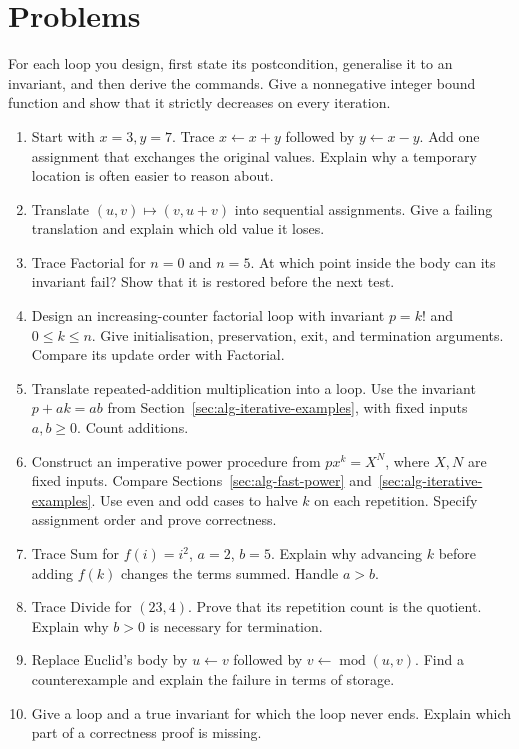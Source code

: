 \section*{Problems}
For each loop you design, first state its postcondition, generalise it to
an invariant, and then derive the commands. Give a nonnegative integer
bound function and show that it strictly decreases on every iteration.
\begin{enumerate}
\setlength{\itemsep}{1pt}\setlength{\parsep}{0pt}
\item Start with $x=3,y=7$. Trace $x\leftarrow x+y$ followed by
$y\leftarrow x-y$. Add one assignment that exchanges the original values.
Explain why a temporary location is often easier to reason about.
\item Translate $(u,v)\mapsto(v,u+v)$ into sequential assignments.
Give a failing translation and explain which old value it loses.
\item Trace Factorial for $n=0$ and $n=5$. At which point inside the body
can its invariant fail? Show that it is restored before the next test.
\item Design an increasing-counter factorial loop with invariant
$p=k!$ and $0\leq k\leq n$. Give initialisation, preservation, exit, and
termination arguments. Compare its update order with Factorial.
\item Translate repeated-addition multiplication into a loop. Use the
invariant $p+ak=ab$ from Section~\ref{sec:alg-iterative-examples}, with
fixed inputs $a,b\geq0$. Count additions.
\item Construct an imperative power procedure from $p x^k=X^N$, where
$X,N$ are fixed inputs. Compare Sections~\ref{sec:alg-fast-power}
and~\ref{sec:alg-iterative-examples}. Use even and odd cases to halve $k$ on each
repetition. Specify assignment order and prove correctness.
\item Trace Sum for $f(i)=i^2$, $a=2$, $b=5$. Explain why advancing $k$
before adding $f(k)$ changes the terms summed. Handle $a>b$.
\item Trace Divide for $(23,4)$. Prove that its repetition count is the
quotient. Explain why $b>0$ is necessary for termination.
\item Replace Euclid's body by $u\leftarrow v$ followed by
$v\leftarrow\operatorname{mod}(u,v)$. Find a counterexample and explain
the failure in terms of storage.
\item Give a loop and a true invariant for which the loop never ends.
Explain which part of a correctness proof is missing.

\end{enumerate}

